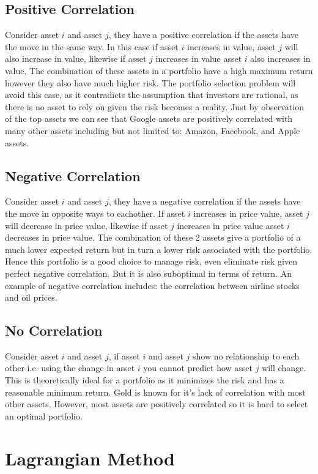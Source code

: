 \documentclass[11pt]{article}
\begin{document}
\subsection{Positive Correlation}
Consider asset $i$ and asset $j$, they have a positive correlation if the assets have the move in the same way. In this case if asset $i$ increases in value, asset $j$ will also increase in value, likewise if asset $j$ increases in value asset $i$ also increases in value. The combination of these assets in a portfolio have a high maximum return however they also have much higher risk. The portfolio selection problem will avoid this case, as it contradicts the assumption that investors are rational, as there is no asset to rely on given the risk becomes a reality. Just by observation of the top assets we can see that Google assets are positively correlated with many other assets including but not limited to: Amazon, Facebook, and Apple assets.
\subsection{Negative Correlation}
Consider asset $i$ and asset $j$, they have a negative correlation if the assets have the move in opposite ways to eachother. If asset $i$ increases in price value, asset $j$ will decrease in price value, likewise if asset $j$ increases in price value asset $i$ decreases  in price value. The combination of these 2 assets give a portfolio of a much lower expected return but in turn a lower risk associated with the portfolio. Hence this portfolio is a good choice to manage risk, even eliminate risk given perfect negative correlation. But it is also suboptimal in terms of return. An example of negative correlation includes: the correlation between airline stocks and oil prices.
\subsection{No Correlation}
Consider asset $i$ and asset $j$, if asset $i$ and asset $j$ show no relationship to each other i.e. using the change in asset $i$ you cannot predict how asset $j$ will change. This is theoretically ideal for a portfolio as it minimizes the risk and has a reasonable minimum return. Gold is known for it's lack of correlation with most other assets. However, most assets are positively correlated so it is hard to select an optimal portfolio.
\section{ Lagrangian Method}
\end{document}
